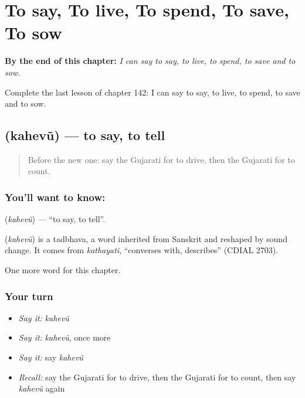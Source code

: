 
\chapter{To say, To live, To spend, To save, To sow}
\label{ch:gu-to-say-to-live-to-spend-to-save-to-sow}

\begin{chapteropening}
\textbf{By the end of this chapter:} \emph{I can say to say, to live, to spend, to save and to sow.}

Complete the last lesson of chapter 142: I can say to say, to live, to spend, to save and to sow.
\end{chapteropening}

\section[\texorpdfstring{\gu{કહેવું} (kahevũ)}{કહેવું (kahevũ)}]{ (kahevũ) — to say, to tell}

\label{lesson:GU-C142-kahevu}



\begin{quote}
Before the new one: say the Gujarati for to drive, then the Gujarati for to count.
\end{quote}

\subsection*{You'll want to know: }
\textbf{} (\emph{kahevũ}) — \textquotedblleft{}to say, to tell\textquotedblright{}.

\begin{cousinweb}
\textbf{} (\emph{kahevũ}) is a tadbhava, a word inherited from Sanskrit and reshaped by sound change. It comes from \emph{kathayati}, \textquotedblleft{}converses with, describes\textquotedblright{} (CDIAL 2703).
\end{cousinweb}

\begin{grammarlens}[title={What you've built}]
One more word for this chapter.
\end{grammarlens}

\subsection*{Your turn}
\begin{itemize}
\raggedright
  \item \emph{Say it:} \emph{kahevũ}
  \item \emph{Say it:} \emph{kahevũ}, once more
  \item \emph{Say it:} say \emph{kahevũ}
  \item \emph{Recall:} say the Gujarati for to drive, then the Gujarati for to count, then say \emph{kahevũ} again
\end{itemize}

